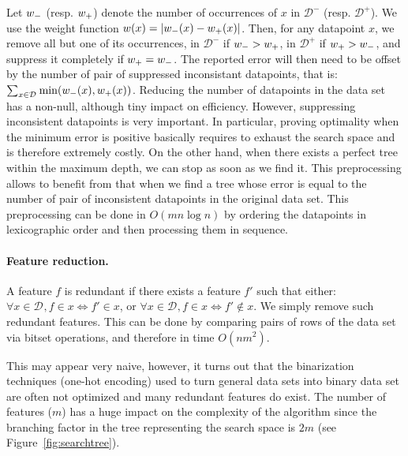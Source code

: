 \documentclass{llncs}
\def\posclass{+}
\def\negclass{-}
\def\datasymb{D}
\newcommand{\setex}[1]{\ensuremath{{\mathcal \datasymb}^{#1}}\xspace}
\newcommand{\allex}{{\setex{}}\xspace}
\newcommand{\afeat}[0]{\ensuremath{f}}
\newcommand{\weight}[1][]{\ensuremath{\ifthenelse{\equal{#1}{}}{w}{w({#1})}}}
\newcommand{\numex}[0]{\ensuremath{n}}
\newcommand{\numfeat}[0]{\ensuremath{m}}
\begin{document}
Let $\weight_{\negclass}$ (resp. $\weight_{\posclass}$) denote the number of occurrences of $x$ in $\setex{\negclass}$ (resp. $\setex{\posclass}$). We use the weight function $\weight[x] = |\weight_{\negclass}(x) - \weight_{\posclass}(x)|$. Then, for any datapoint $x$, we remove all but one of its occurrences, in $\setex{\negclass}$ if $\weight_{\negclass}>\weight_{\posclass}$, in $\setex{\posclass}$ if $\weight_{\posclass}>\weight_{\negclass}$, and suppress it completely if $\weight_{\posclass}=\weight_{\negclass}$.
The reported error will then need to be offset by the number of pair of suppressed inconsistant datapoints, that is:
$
\sum_{x \in \allex}\min(\weight_{\negclass}(x), \weight_{\posclass}(x))
$.
Reducing the number of datapoints in the data set has a non-null, although tiny impact on efficiency. However, suppressing inconsistent datapoints is very important. In particular, proving optimality when the minimum error is positive basically requires to exhaust the search space and is therefore extremely costly. On the other hand, when there exists a perfect tree within the maximum depth, we can stop as soon as we find it. This preprocessing allows to benefit from that when we find a tree whose error is equal to the number of pair of inconsistent datapoints in the original data set.
This preprocessing can be done in $O(\numfeat \numex \log \numex)$ by ordering the datapoints in lexicographic order and then processing them in sequence.

\paragraph{Feature reduction.}

A feature $\afeat$ is redundant if there exists a feature $\afeat'$ such that either: $\forall x \in \allex, \afeat \in x \iff \afeat' \in x$, or $\forall x \in \allex, \afeat \in x \iff \afeat' \not\in x$. We simply remove such redundant features. This can be done by comparing pairs of rows of the data set via bitset operations, and therefore in time $O(\numex\numfeat^2)$.

This may appear very naive, however, it turns out that the binarization techniques (one-hot encoding) used to turn general data sets into binary data set are often not optimized and many redundant features do exist. The number of features ($\numfeat$) has a huge impact on the complexity of the algorithm since the branching factor in the tree representing the search space is $2\numfeat$ (see Figure~\ref{fig:searchtree}).
\end{document}
